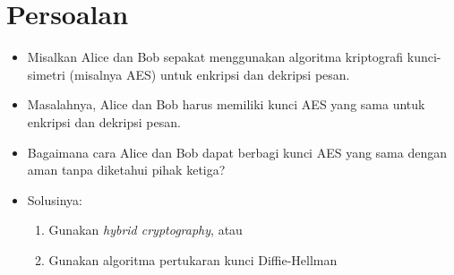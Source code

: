 \documentclass{article}
\begin{document}

\section*{Persoalan}

\begin{itemize}
    \item Misalkan Alice dan Bob sepakat menggunakan algoritma kriptografi kunci-simetri (misalnya AES) untuk enkripsi dan dekripsi pesan.
    \item Masalahnya, Alice dan Bob harus memiliki kunci AES yang sama untuk enkripsi dan dekripsi pesan.
    \item Bagaimana cara Alice dan Bob dapat berbagi kunci AES yang sama dengan aman tanpa diketahui pihak ketiga?
    \item Solusinya: 
    \begin{enumerate}
        \item Gunakan \textit{hybrid cryptography}, atau
        \item Gunakan algoritma pertukaran kunci Diffie-Hellman
    \end{enumerate}
\end{itemize}
\end{document}
